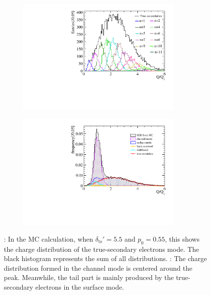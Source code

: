 \begin{figure}[h]
	\begin{subfigure}{0.5\textwidth}
		\includegraphics[width=0.9\textwidth]{PMTRelated/GTmodel/true_all.pdf}
		\caption{}
		\label{fig:true_n}
	\end{subfigure}%
	\hfill
	\begin{subfigure}{0.5\textwidth}
		\includegraphics[width=0.9\textwidth]{PMTRelated/GTmodel/allmode.pdf}
		\caption{}
		\label{fig:allmode}
	\end{subfigure}
	\caption{: In the MC calculation, when $\delta_{\mathrm{ts}}' = 5.5$ and $p_0 = 0.55$, this shows the charge distribution of the true-secondary electrons mode. The black histogram represents the sum of all distributions. : The charge distribution formed in the channel mode is centered around the peak. Meanwhile, the tail part is mainly produced by the true-secondary electrons in the surface mode. }
\end{figure}

